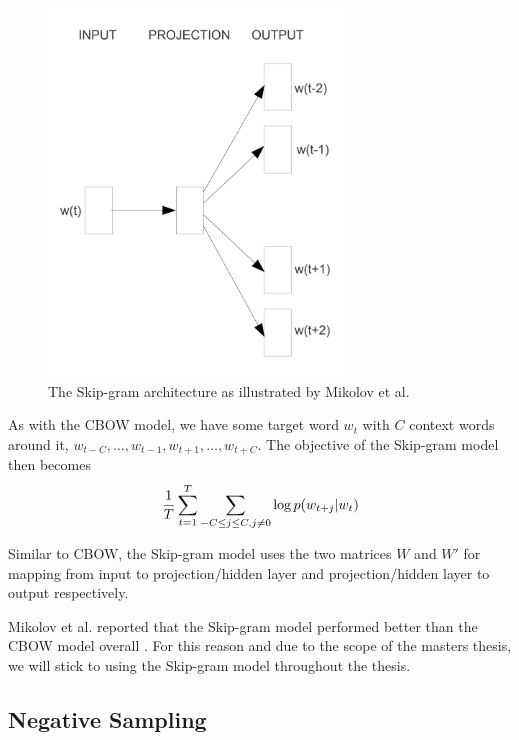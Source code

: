 \begin{figure}[ht]
    \centering
    \includegraphics[width=8cm]{thesis/figures/skip-gram-mikolov-et-al-2013.png}
    \caption{The Skip-gram architecture as illustrated by Mikolov et al. \cite{mikolov2013a}}
    \label{fig:skip-gram-model}
\end{figure}

\noindent
As with the CBOW model, we have some target word $w_t$ with $C$ context words around it, $w_{t-C}, \ldots, w_{t-1}, w_{t+1}, \ldots, w_{t+C}$. The objective of the Skip-gram model \cite{mikolov2013b} then becomes
\begin{align}
    \frac{1}{T} \sum\limits_{t=1}^{T} \sum\limits_{-C \leq j \leq C, j \neq 0}^{} \log  p(w_{t+j} | w_t)
\end{align}

\noindent
Similar to CBOW, the Skip-gram model uses the two matrices $W$ and $W'$ for mapping from input to projection/hidden layer and projection/hidden layer to output respectively.

\noindent
Mikolov et al. reported that the Skip-gram model performed better than the CBOW model overall \cite{mikolov2013a}. For this reason and due to the scope of the masters thesis, we will stick to using the Skip-gram model throughout the thesis.

\subsection{Negative Sampling}

